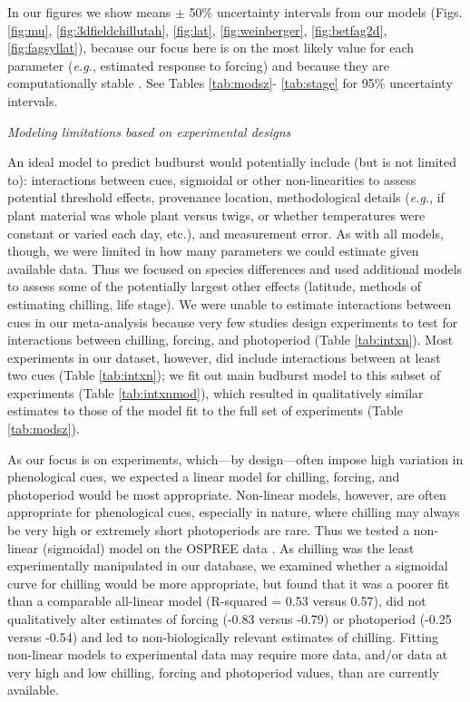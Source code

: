 \documentclass{article}
\begin{document}
In our figures  we show means $\pm$ 50\% uncertainty intervals from our models (Figs. \ref{fig:mu}, \ref{fig:3dfieldchillutah}, \ref{fig:lat}, \ref{fig:weinberger}, \ref{fig:betfag2d}, \ref{fig:fagsyllat}), because our focus here is on the most likely value for each parameter (\emph{e.g.}, estimated response to forcing) and because they are computationally stable \emph{\citep{Carpenter:2016aa,BDA}}. See Tables \ref{tab:modsz}- \ref{tab:stage} for 95\% uncertainty intervals. 

\noindent \emph{Modeling limitations based on experimental designs}
\par An ideal model to predict budburst would potentially include (but is not limited to): interactions between cues, sigmoidal or other non-linearities to assess potential threshold effects, provenance location, methodological details (\emph{e.g.}, if plant material was whole plant versus twigs, or whether temperatures were constant or varied each day, etc.), and measurement error. As with all models, though, we were limited in how many parameters we could estimate given available data. Thus we focused on species differences and used additional models to assess some of the potentially largest other effects (latitude, methods of estimating chilling, life stage). We were unable to estimate interactions between cues in our meta-analysis because very few studies design experiments to test for interactions between chilling, forcing, and photoperiod (Table \ref{tab:intxn}). Most experiments in our dataset, however, did include interactions between at least two cues (Table \ref{tab:intxn}); we fit out main budburst model to this subset of experiments (Table \ref{tab:intxnmod}), which resulted in qualitatively similar estimates to those of the model fit to the full set of experiments (Table \ref{tab:modsz}).
\par As our focus is on experiments, which---by design---often impose high variation in phenological cues, we expected a linear model for chilling, forcing, and photoperiod would be most appropriate. Non-linear models, however, are often appropriate for phenological cues, especially in nature, where chilling may always be very high or extremely short photoperiods are rare. Thus we tested a non-linear (sigmoidal) model on the OSPREE data \emph{\citep{pmp}}. As chilling was the least experimentally manipulated in our database, we examined whether a sigmoidal curve for chilling would be more appropriate, but found that it was a poorer fit than a comparable all-linear model (R-squared = 0.53 versus 0.57), did not qualitatively alter estimates of forcing (-0.83 versus -0.79) or photoperiod (-0.25 versus -0.54) and led to non-biologically relevant estimates of chilling. Fitting non-linear models to experimental data may require more data, and/or data at very high and low chilling, forcing and photoperiod values, than are currently available. 
\end{document}
